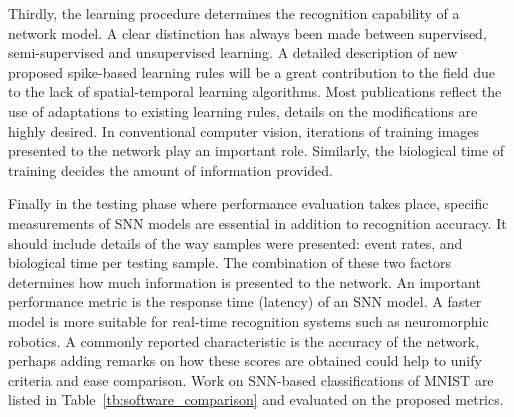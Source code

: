 Thirdly, the learning procedure determines the recognition capability of a network model.
A clear distinction has always been made between supervised, semi-supervised and unsupervised learning.
A detailed description of new proposed spike-based learning rules will be a great contribution to the field due to the lack of spatial-temporal learning algorithms.
Most publications reflect the use of adaptations to existing learning rules, details on the modifications are highly desired.
In conventional computer vision, iterations of training images presented to the network play an important role.
Similarly, the biological time of training decides the amount of information provided.



Finally in the testing phase where performance evaluation takes place, specific measurements of SNN models are essential in addition to recognition accuracy.
It should include details of the way samples were presented: event rates, and biological time per testing sample.
The combination of these two factors determines how much information is presented to the network.
An important performance metric is the response time (latency) of an SNN model.
A faster model is more suitable for real-time recognition systems such as neuromorphic robotics.
A commonly reported characteristic is the accuracy of the network, perhaps adding remarks on how these scores are obtained could help to unify criteria and ease comparison.
Work on SNN-based classifications of MNIST are listed in Table~\ref{tb:software_comparison} and evaluated on the proposed metrics.

